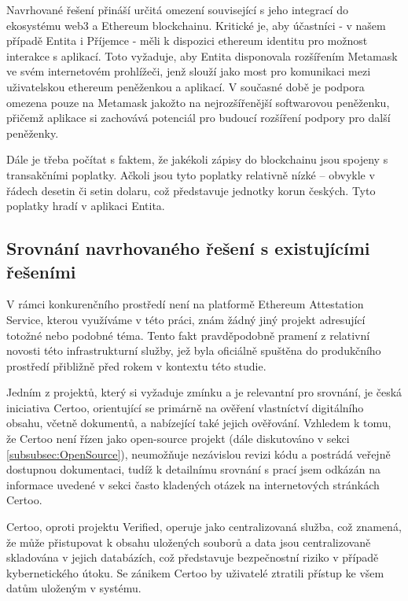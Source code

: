Navrhované řešení přináší určitá omezení související s jeho integrací do ekosystému web3 a Ethereum blockchainu. Kritické je, aby účastníci - v našem případě Entita i Příjemce - měli k dispozici ethereum identitu pro možnost interakce s aplikací. Toto vyžaduje, aby Entita disponovala rozšířením Metamask ve svém internetovém prohlížeči, jenž slouží jako most pro komunikaci mezi uživatelskou ethereum peněženkou a aplikací. V současné době je podpora omezena pouze na Metamask jakožto na nejrozšířenější softwarovou  peněženku, přičemž aplikace si zachovává potenciál pro budoucí rozšíření podpory pro další peněženky.

Dále je třeba počítat s faktem, že jakékoli zápisy do blockchainu jsou spojeny s transakčními poplatky. Ačkoli jsou tyto poplatky relativně nízké – obvykle v řádech desetin či setin dolaru, což představuje jednotky korun českých. Tyto poplatky hradí v aplikaci Entita.




\subsection{Srovnání navrhovaného řešení s existujícími řešeními}\label{subsec: Competition}

V rámci konkurenčního prostředí není na platformě Ethereum Attestation Service, kterou využíváme v této práci, znám žádný jiný projekt adresující totožné nebo podobné téma. Tento fakt pravděpodobně pramení z relativní novosti této infrastrukturní služby, jež byla oficiálně spuštěna do produkčního prostředí přibližně před rokem v kontextu této studie.

Jedním z projektů, který si vyžaduje zmínku a je relevantní pro srovnání, je česká iniciativa Certoo, orientující se primárně na ověření vlastníctví digitálního obsahu, včetně dokumentů, a nabízející také jejich ověřování. Vzhledem k tomu, že Certoo není řízen jako open-source projekt (dále diskutováno v sekci \ref{subsubsec:OpenSource}), neumožňuje nezávislou revizi kódu a postrádá veřejně dostupnou dokumentaci, tudíž k detailnímu srovnání s prací jsem odkázán na informace uvedené v sekci často kladených otázek na internetových stránkách Certoo.

Certoo, oproti projektu Verified, operuje jako centralizovaná služba, což znamená, že může přistupovat k obsahu uložených souborů a data jsou centralizovaně skladována v jejich databázích, což představuje bezpečnostní riziko v případě kybernetického útoku. Se zánikem Certoo by uživatelé ztratili přístup ke všem datům uloženým v systému.

